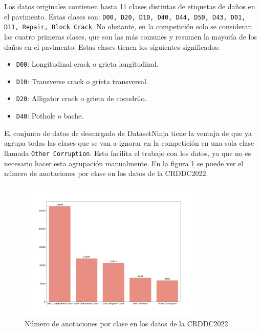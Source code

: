 Los datos originales contienen hasta 11 clases distintas de etiquetas de daños en el pavimento. Estas clases son: \texttt{D00, D20, D10, D40, D44, D50, D43, D01, D11, Repair, Block Crack}. No obstante, en la competición solo se consideran las cuatro primeras clases, que son las más comunes y resumen la mayoría de los daños en el pavimento. Estas clases tienen los siguientes significados:

\begin{itemize}
    \item \texttt{D00}: Longitudinal crack o grieta longitudinal.
    \item \texttt{D10}: Transverse crack o grieta transversal.
    \item \texttt{D20}: Alligator crack o grieta de cocodrilo.
    \item \texttt{D40}: Pothole o bache.
\end{itemize}

El conjunto de datos de descargado de DatasetNinja tiene la ventaja de que ya agrupa todas las clases que se van a ignorar en la competición en una sola clase llamada \texttt{Other Corruption}. Esto facilita el trabajo con los datos, ya que no es necesario hacer esta agrupación manualmente. En la figura \ref{fig:datasetNinja_class_count_bar} se puede ver el número de anotaciones por clase en los datos de la CRDDC2022.

\begin{figure}[H]
    \centering
    \includegraphics[width=0.8\textwidth]{graphs/datasetNinja_class_count_bar.png}
    \caption{Número de anotaciones por clase en los datos de la CRDDC2022.}
    \label{fig:datasetNinja_class_count_bar}
\end{figure}



